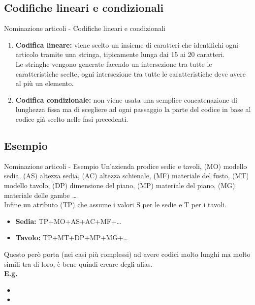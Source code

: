 \documentclass{beamer}
\begin{document}
\subsection{Codifiche lineari e condizionali}
\begin{frame}{Nominazione articoli - Codifiche lineari e condizionali}
    \begin{enumerate}
        \item \textbf{Codifica lineare:} viene scelto un insieme di caratteri che identifichi ogni articolo tramite una stringa, tipicamente lunga dai 15 ai 20 caratteri.\\
            Le stringhe vengono generate facendo un intersezione tra tutte le caratteristiche scelte, ogni intersezione tra tutte le caratteristiche deve avere al più un elemento.
        \item \textbf{Codifica condizionale:} non viene usata una semplice concatenazione di lunghezza fissa ma di scegliere ad ogni passaggio la parte del codice in base al codice già scelto nelle fasi precedenti.
    \end{enumerate}
\end{frame}

\subsection{Esempio}
\begin{frame}{Nominazione articoli - Esempio}
    Un'azienda prodice sedie e tavoli, (MO) modello sedia, (AS) altezza sedia, (AC) altezza schienale, (MF) materiale del fusto, (MT) modello tavolo, (DP) dimensione del piano, (MP) materiale del piano, (MG) materiale delle gambe \dots\\
    Infine un atributo (TP) che assume i valori S per le sedie e T per i tavoli.\\
    \begin{itemize}
        \item \textbf{Sedia:} TP+MO+AS+AC+MF+\dots
        \item \textbf{Tavolo:} TP+MT+DP+MP+MG+\dots
    \end{itemize}
    Questo però porta (nei casi più complessi) ad avere codici molto lunghi ma molto simili tra di loro, è bene quindi creare degli alias.\\
    \textbf{E.g.}\\
    \begin{itemize}
        \item \color{red}{Luxury01}
        \item \color{blue}{Luxury02}
    \end{itemize}
\end{frame}
\end{document}
